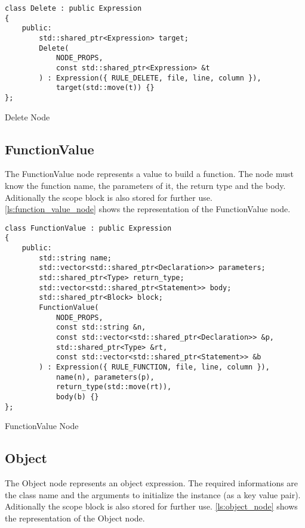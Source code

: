\begin{listing}[H]
\begin{verbatim}
class Delete : public Expression
{
    public:
        std::shared_ptr<Expression> target;
        Delete(
            NODE_PROPS,
            const std::shared_ptr<Expression> &t
        ) : Expression({ RULE_DELETE, file, line, column }),
            target(std::move(t)) {}
};
\end{verbatim}
\caption{Delete Node}
\label{ls:delete_node}
\end{listing}

\subsection{FunctionValue}

The FunctionValue node represents a value to build a function. The node must know the function name,
the parameters of it, the return type and the body. Aditionally the scope block is also stored for further use.
\autoref{ls:function_value_node} shows the representation of the FunctionValue node.

\begin{listing}[H]
\begin{verbatim}
class FunctionValue : public Expression
{
    public:
        std::string name;
        std::vector<std::shared_ptr<Declaration>> parameters;
        std::shared_ptr<Type> return_type;
        std::vector<std::shared_ptr<Statement>> body;
        std::shared_ptr<Block> block;
        FunctionValue(
            NODE_PROPS,
            const std::string &n,
            const std::vector<std::shared_ptr<Declaration>> &p,
            std::shared_ptr<Type> &rt,
            const std::vector<std::shared_ptr<Statement>> &b
        ) : Expression({ RULE_FUNCTION, file, line, column }),
            name(n), parameters(p),
            return_type(std::move(rt)),
            body(b) {}
};
\end{verbatim}
\caption{FunctionValue Node}
\label{ls:function_value_node}
\end{listing}

\subsection{Object}

The Object node represents an object expression. The required informations are the class name and the arguments to initialize the instance (as a key value pair).
Aditionally the scope block is also stored for further use.
\autoref{ls:object_node} shows the representation of the Object node.

